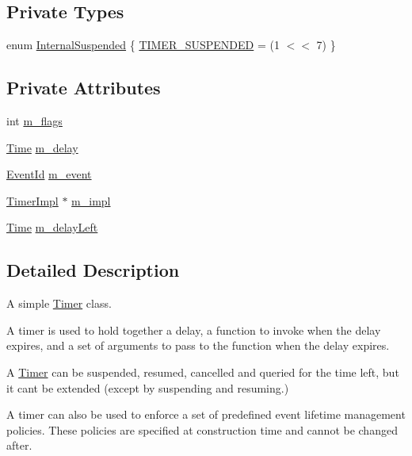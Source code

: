 \subsection*{Private Types}
\begin{DoxyCompactItemize}
\item 
enum \hyperlink{classns3_1_1Timer_a6d79129469d60d602b86e5aa1a1452b2}{Internal\+Suspended} \{ \hyperlink{classns3_1_1Timer_a6d79129469d60d602b86e5aa1a1452b2a5d1b4cc12c4e000304ace7c09cfa6a4f}{T\+I\+M\+E\+R\+\_\+\+S\+U\+S\+P\+E\+N\+D\+ED} = (1 $<$$<$ 7)
 \}
\end{DoxyCompactItemize}
\subsection*{Private Attributes}
\begin{DoxyCompactItemize}
\item 
int \hyperlink{classns3_1_1Timer_a807d2dc469a7a90e18ab39f50edd420f}{m\+\_\+flags}
\item 
\hyperlink{classns3_1_1Time}{Time} \hyperlink{classns3_1_1Timer_ad116dff0fe3cb03e8b81bded08745ba8}{m\+\_\+delay}
\item 
\hyperlink{classns3_1_1EventId}{Event\+Id} \hyperlink{classns3_1_1Timer_a53f4b3ad509801685a817d49f0e002fe}{m\+\_\+event}
\item 
\hyperlink{classns3_1_1TimerImpl}{Timer\+Impl} $\ast$ \hyperlink{classns3_1_1Timer_a2a82602577e5145f094205e076850e64}{m\+\_\+impl}
\item 
\hyperlink{classns3_1_1Time}{Time} \hyperlink{classns3_1_1Timer_aec500b5e030558033908ec99695e1630}{m\+\_\+delay\+Left}
\end{DoxyCompactItemize}


\subsection{Detailed Description}
A simple \hyperlink{classns3_1_1Timer}{Timer} class. 

A timer is used to hold together a delay, a function to invoke when the delay expires, and a set of arguments to pass to the function when the delay expires.

A \hyperlink{classns3_1_1Timer}{Timer} can be suspended, resumed, cancelled and queried for the time left, but it can\textquotesingle{}t be extended (except by suspending and resuming.)

A timer can also be used to enforce a set of predefined event lifetime management policies. These policies are specified at construction time and cannot be changed after.

